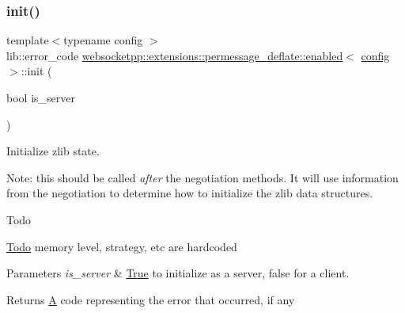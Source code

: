 \subsubsection{\texorpdfstring{init()}{init()}}
{\footnotesize\ttfamily template$<$typename config $>$ \\
lib\+::error\+\_\+code \mbox{\hyperlink{classwebsocketpp_1_1extensions_1_1permessage__deflate_1_1enabled}{websocketpp\+::extensions\+::permessage\+\_\+deflate\+::enabled}}$<$ \mbox{\hyperlink{classconfig}{config}} $>$\+::init (\begin{DoxyParamCaption}\item[{bool}]{is\+\_\+server }\end{DoxyParamCaption})\hspace{0.3cm}{\ttfamily [inline]}}



Initialize zlib state. 

Note\+: this should be called {\itshape after} the negotiation methods. It will use information from the negotiation to determine how to initialize the zlib data structures.

\begin{DoxyRefDesc}{Todo}
\item[\mbox{\hyperlink{todo__todo000011}{Todo}}]memory level, strategy, etc are hardcoded\end{DoxyRefDesc}



\begin{DoxyParams}{Parameters}
{\em is\+\_\+server} & \mbox{\hyperlink{struct_true}{True}} to initialize as a server, false for a client. \\
\hline
\end{DoxyParams}
\begin{DoxyReturn}{Returns}
\mbox{\hyperlink{struct_a}{A}} code representing the error that occurred, if any 
\end{DoxyReturn}
\mbox{\label{classwebsocketpp_1_1extensions_1_1permessage__deflate_1_1enabled_a5190a82b1571a94704cef6959ed78ce2}} 

